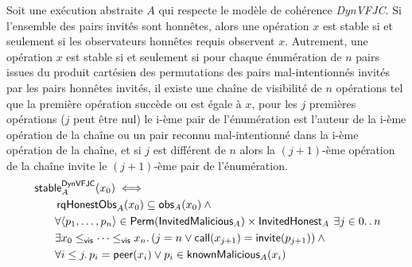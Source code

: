 \begin{theorem}\label{th:svfjc-stability}
Soit une exécution abstraite $A$ qui respecte le modèle de cohérence \emph{DynVFJC}.
Si l'ensemble des pairs invités sont honnêtes, alors une opération $x$ est stable si et seulement si les observateurs honnêtes requis observent $x$.
Autrement, une opération $x$ est stable si et seulement si pour chaque énumération de $n$ pairs issues du produit cartésien des permutations des pairs mal-intentionnés invités par les pairs honnêtes invités, il existe une chaîne de visibilité de $n$ opérations tel que la première opération succède ou est égale à $x$, pour les $j$ premières opérations ($j$ peut être nul) le i-ème pair de l'énumération est l'auteur de la i-ème opération de la chaîne ou un pair reconnu mal-intentionné dans la i-ème opération de la chaîne, et si $j$ est différent de $n$ alors la $(j+1)$-ème opération de la chaîne invite le $(j+1)$-ème pair de l'énumération.
\begin{equation*}\begin{split}
\MoveEqLeft\trm{stable}_A^{\trm{DynVFJC}}(x_0) \iff\\
    &\trm{rqHonestObs}_A(x_0) \subseteq \trm{obs}_A(x_0) \:\land \\
    &\forall \tuple*{p_1, \dotsc, p_n} \in \trm{Perm}(\trm{InvitedMalicious}_A) \times \trm{InvitedHonest}_A
    \:\exists j \in 0 \ldotp\ldotp n \\
    & \exists x_0 \viseq \dotsb \viseq x_n \qsep
    (j = n \lor \trm{call}(x_{j+1}) = \trm{invite}(p_{j+1})) \:\land\\
    &\forall i \leq j \qsep p_i = \trm{peer}(x_i) \lor p_i \in \trm{knownMalicious}_A(x_i)
\end{split}\end{equation*}
\end{theorem}

